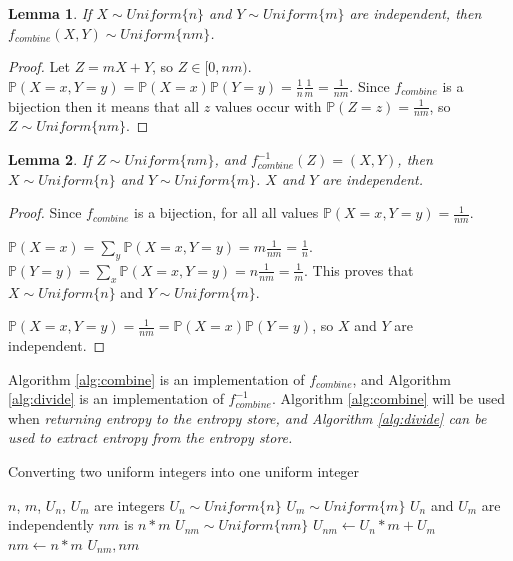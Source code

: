 \documentclass[12pt]{article}
\newtheorem{lemma}{Lemma}
\begin{document}
\begin{lemma}
    If $X \sim Uniform\{n\}$ and $Y \sim Uniform\{m\}$ are independent, then 
    $f_{combine}(X,Y) \sim Uniform \{nm\}$.
\end{lemma}

\begin{proof}
    Let $Z = mX+Y$, so $Z \in [0,nm)$. $\mathbb{P}(X=x,Y=y) = \mathbb{P}(X=x)\mathbb{P}(Y=y) = \frac{1}{n}\frac{1}{m} = \frac{1}{nm}$. Since $f_{combine}$ is a bijection then it means that all $z$ values occur with $\mathbb{P}(Z=z) = \frac{1}{nm}$, so $Z \sim Uniform\{nm\}$.
    
\end{proof}

\begin{lemma}
    If $Z \sim Uniform \{nm\}$, and $f^{-1}_{combine}(Z) = (X,Y)$, then $X \sim Uniform\{n\}$ and $Y \sim Uniform\{m\}$. $X$ and $Y$ are independent.
\end{lemma}

\begin{proof}
    Since $f_{combine}$ is a bijection, for all all values $\mathbb{P}(X=x,Y=y) = \frac{1}{nm}$.

    $\mathbb{P}(X=x) = \sum_{y}\mathbb{P}(X=x,Y=y) = m\frac{1}{nm} = \frac{1}{n}$. $\mathbb{P}(Y=y) = \sum_{x}\mathbb{P}(X=x,Y=y) = n\frac{1}{nm} = \frac{1}{m}$. This proves that $X\sim Uniform\{n\}$ and $Y\sim Uniform\{m\}$.

    $\mathbb{P}(X=x,Y=y) = \frac{1}{nm} = \mathbb{P}(X=x)\mathbb{P}(Y=y)$, so $X$ and $Y$ are independent.
\end{proof}

Algorithm \ref{alg:combine} is an implementation of $f_{combine}$, and Algorithm \ref{alg:divide} is an implementation of $f^{-1}_{combine}$. Algorithm \ref{alg:combine} will be used when \em returning \em entropy to the entropy store, and Algorithm \ref{alg:divide} can be used to extract entropy from the entropy store.

\begin{algorithm}
\caption{Converting two uniform integers into one uniform integer}
\label{alg:combine}
\begin{algorithmic}[1]
    \Require $n$, $m$, $U_n$, $U_m$ are integers
    \Require $U_n \sim Uniform\{n\}$
    \Require $U_m \sim Uniform\{m\}$
    \Require $U_n$ and $U_m$ are independently
    \Ensure $nm$ is $n * m$
    \Ensure $U_{nm} \sim Uniform\{nm\}$
  \State $U_{nm} \gets U_n * m + U_m$
  \State $nm \gets n * m$
  \State \Return $U_{nm}, nm$
\EndProcedure
\end{algorithmic}
\end{algorithm}
\end{document}
